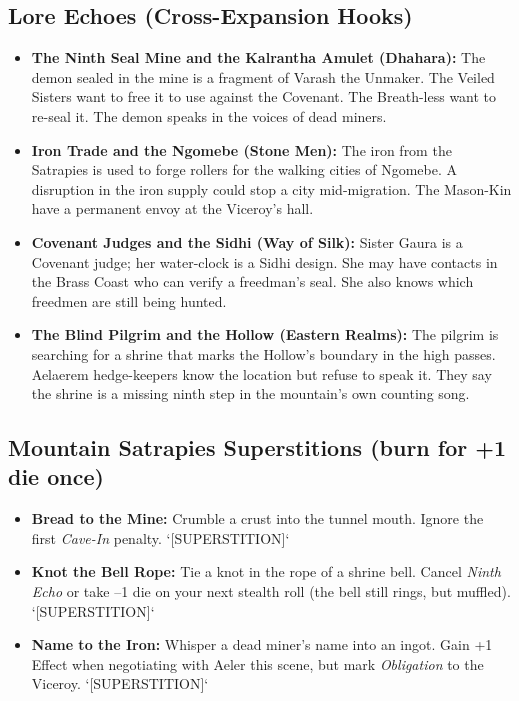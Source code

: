 \subsection*{Lore Echoes (Cross-Expansion Hooks)}
\begin{itemize}
  \item \textbf{The Ninth Seal Mine and the Kalrantha Amulet (Dhahara):} The demon sealed in the mine is a fragment of Varash the Unmaker. The Veiled Sisters want to free it to use against the Covenant. The Breath-less want to re-seal it. The demon speaks in the voices of dead miners.
  \item \textbf{Iron Trade and the Ngomebe (Stone Men):} The iron from the Satrapies is used to forge rollers for the walking cities of Ngomebe. A disruption in the iron supply could stop a city mid-migration. The Mason-Kin have a permanent envoy at the Viceroy's hall.
  \item \textbf{Covenant Judges and the Sidhi (Way of Silk):} Sister Gaura is a Covenant judge; her water-clock is a Sidhi design. She may have contacts in the Brass Coast who can verify a freedman's seal. She also knows which freedmen are still being hunted.
  \item \textbf{The Blind Pilgrim and the Hollow (Eastern Realms):} The pilgrim is searching for a shrine that marks the Hollow's boundary in the high passes. Aelaerem hedge-keepers know the location but refuse to speak it. They say the shrine is a missing ninth step in the mountain's own counting song.
\end{itemize}

\subsection*{Mountain Satrapies Superstitions (burn for +1 die once)}
\begin{itemize}
  \item \textbf{Bread to the Mine:} Crumble a crust into the tunnel mouth. Ignore the first \emph{Cave-In} penalty. `[SUPERSTITION]`
  \item \textbf{Knot the Bell Rope:} Tie a knot in the rope of a shrine bell. Cancel \emph{Ninth Echo} or take –1 die on your next stealth roll (the bell still rings, but muffled). `[SUPERSTITION]`
  \item \textbf{Name to the Iron:} Whisper a dead miner's name into an ingot. Gain +1 Effect when negotiating with Aeler this scene, but mark \emph{Obligation} to the Viceroy. `[SUPERSTITION]`
\end{itemize}

